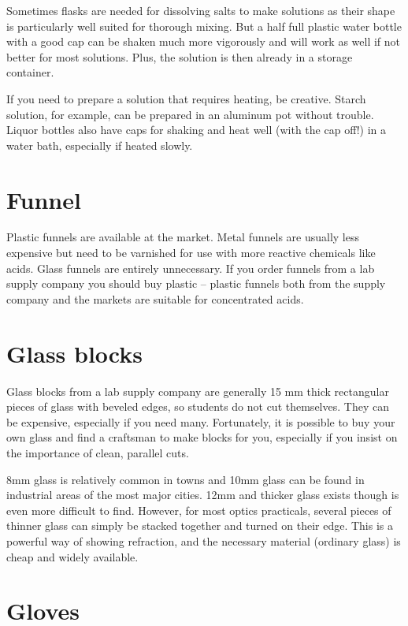 Sometimes flasks are needed for dissolving salts 
to make solutions as their shape is particularly well suited 
for thorough mixing. 
But a half full plastic water bottle with a good cap 
can be shaken much more vigorously 
and will work as well if not better for most solutions. 
Plus, 
the solution is then already in a storage container.

If you need to prepare a solution that requires heating, 
be creative. 
Starch solution, 
for example, 
can be prepared in an aluminum pot without trouble. 
Liquor bottles also have caps for shaking and heat well 
(with the cap off!) in a water bath, 
especially if heated slowly.

\section{Funnel}
Plastic funnels are available at the market. 
Metal funnels are usually less expensive 
but need to be varnished for use with more reactive chemicals like acids. 
Glass funnels are entirely unnecessary. 
If you order funnels from a lab supply company 
you should buy plastic – 
plastic funnels both from the supply company and the markets 
are suitable for concentrated acids.

\section{Glass blocks}
Glass blocks from a lab supply company are 
generally 15 mm thick rectangular pieces of glass with beveled edges, 
so students do not cut themselves. 
They can be expensive, 
especially if you need many. 
Fortunately, 
it is possible to buy your own glass 
and find a craftsman to make blocks for you, 
especially if you insist on the importance of clean, 
parallel cuts. 
 
8mm glass is relatively common in towns 
and 10mm glass can be found in industrial areas of the most major cities. 
12mm and thicker glass exists though is even more difficult to find. 
However, 
for most optics practicals, 
several pieces of thinner glass can simply be stacked together and 
turned on their edge. 
This is a powerful way of showing refraction, 
and the necessary material (ordinary glass) is cheap and widely available.

\section{Gloves}

